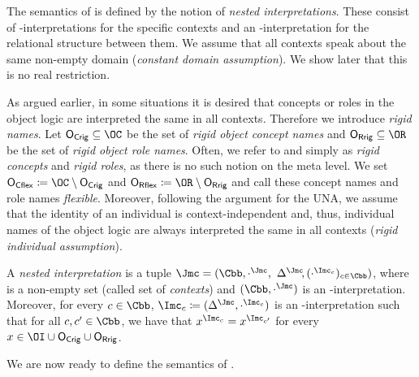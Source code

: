 The semantics of \LMLO is defined by the notion of \emph{nested interpretations}.  These consist of
\Osig-interpretations for the specific contexts and an \Msig-interpretation for the relational
structure between them.  We assume that all contexts speak about the same non-empty domain
(\emph{constant domain assumption}). We show later that this is no real restriction.

As argued earlier, in some situations it is desired that concepts or roles in the object logic are
interpreted the same in all contexts. Therefore we introduce \emph{rigid names}. Let
$\OCR\subseteq\OC$ be the set of \emph{rigid object concept names} and $\ORR\subseteq\OR$ be the set
of \emph{rigid object role names}.  Often, we refer to \OCR and \ORR simply as \emph{rigid concepts}
and \emph{rigid roles}, as there is no such notion on the meta level.  We set
$\OCF\coloneqq\OC\setminus\OCR$ and $\ORF\coloneqq\OR\setminus\ORR$ and call these concept names and
role names \emph{flexible}.  Moreover, following the argument for the UNA, we assume that the
identity of an individual is context-independent and, thus, individual names of the object logic are
always interpreted the same in all contexts (\emph{rigid individual assumption}).

\begin{definition}\label{def:nested-interpretation}
  A \emph{nested interpretation} is a tuple
  $\J=(\Cbb,\cdot^{\J},$ $\Delta^{\J}{\kern-0.2em},(\cdot^{\I_c})_{c\in\Cbb})$, where \Cbb is a
  non-empty set (called set of \emph{contexts}) and $(\Cbb,\cdot^\J)$ is an \Msig-inter\-pre\-ta\-tion.
  Moreover, for every $c\in\Cbb$, $\I_c\coloneqq(\Delta^{\J},\cdot^{\I_c})$ is an
  \Osig-interpretation such that for all $c,c'\in\Cbb$, we have that $x^{\I_{c}}=x^{\I_{c'}}$ for
  every $x\in\OI\cup\OCR\cup\ORR$.
\end{definition}

\noindent
We are now ready to define the semantics of \LMLO.

